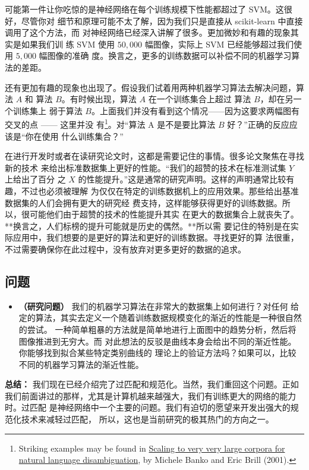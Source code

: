 可能第一件让你吃惊的是神经网络在每个训练规模下性能都超过了 SVM。这很好，尽管你对
细节和原理可能不太了解，因为我们只是直接从 scikit-learn 中直接调用了这个方法，而
对神经网络已经深入讲解了很多。更加微妙和有趣的现象其实是如果我们训
练 SVM 使用 $50,000$ 幅图像，实际上 SVM 已经能够超过我们使用 $5,000$ 幅图像的准确
度。换言之，更多的训练数据可以补偿不同的机器学习算法的差距。

还有更加有趣的现象也出现了。假设我们试着用两种机器学习算法去解决问题，算法 $A$ 和
算法 $B$。有时候出现，算法 $A$ 在一个训练集合上超过 算法 $B$，却在另一个训练集上
弱于算法 $B$。上面我们并没有看到这个情况——因为这要求两幅图有交叉的点 —— 这里并没
有\footnote{Striking examples may be found in
  \href{http://dx.doi.org/10.3115/1073012.1073017}{Scaling to very very large
    corpora for natural language disambiguation}, by Michele Banko and Eric
  Brill (2001).}。对“算法 A 是不是要比算法 $B$ 好？”正确的反应应该是“你在使用
什么训练集合？”

在进行开发时或者在读研究论文时，这都是需要记住的事情。很多论文聚焦在寻找新的技术
来给出标准数据集上更好的性能。“我们的超赞的技术在标准测试集 $Y$ 上给出了百分
之 $X$ 的性能提升。”这是通常的研究声明。这样的声明通常比较有趣，不过也必须被理解
为仅仅在特定的训练数据机上的应用效果。那些给出基准数据集的人们会拥有更大的研究经
费支持，这样能够获得更好的训练数据。所以，很可能他们由于超赞的技术的性能提升其实
在更大的数据集合上就丧失了。**换言之，人们标榜的提升可能就是历史的偶然。**所以需
要记住的特别是在实际应用中，我们想要的是更好的算法和更好的训练数据。寻找更好的算
法很重，不过需要确保你在此过程中，没有放弃对更多更好的数据的追求。

\subsection*{问题}

\begin{itemize}
\item \textbf{（研究问题）} 我们的机器学习算法在非常大的数据集上如何进行？对任何
  给定的算法，其实去定义一个随着训练数据规模变化的渐近的性能是一种很自然的尝试。
  一种简单粗暴的方法就是简单地进行上面图中的趋势分析，然后将图像推进到无穷大。而
  对此想法的反驳是曲线本身会给出不同的渐近性能。你能够找到拟合某些特定类别曲线的
  理论上的验证方法吗？如果可以，比较不同的机器学习算法的渐近性能。
\end{itemize}

\textbf{总结：} 我们现在已经介绍完了过匹配和规范化。当然，我们重回这个问题。正如
我们前面讲过的那样，尤其是计算机越来越强大，我们有训练更大的网络的能力时。过匹配
是神经网络中一个主要的问题。我们有迫切的愿望来开发出强大的规范化技术来减轻过匹配，
所以，这也是当前研究的极其热门的方向之一。

